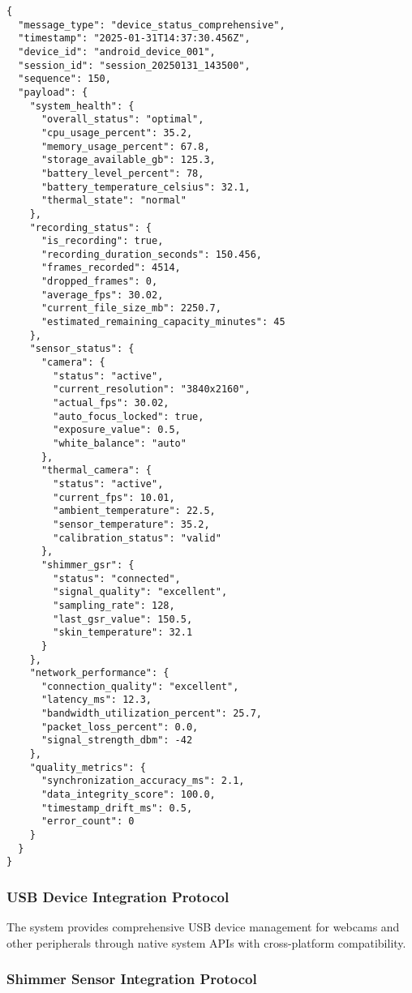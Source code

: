 \documentclass[12pt,a4paper]{article}
\begin{document}
\begin{verbatim}
{
  "message_type": "device_status_comprehensive",
  "timestamp": "2025-01-31T14:37:30.456Z",
  "device_id": "android_device_001",
  "session_id": "session_20250131_143500",
  "sequence": 150,
  "payload": {
    "system_health": {
      "overall_status": "optimal",
      "cpu_usage_percent": 35.2,
      "memory_usage_percent": 67.8,
      "storage_available_gb": 125.3,
      "battery_level_percent": 78,
      "battery_temperature_celsius": 32.1,
      "thermal_state": "normal"
    },
    "recording_status": {
      "is_recording": true,
      "recording_duration_seconds": 150.456,
      "frames_recorded": 4514,
      "dropped_frames": 0,
      "average_fps": 30.02,
      "current_file_size_mb": 2250.7,
      "estimated_remaining_capacity_minutes": 45
    },
    "sensor_status": {
      "camera": {
        "status": "active",
        "current_resolution": "3840x2160",
        "actual_fps": 30.02,
        "auto_focus_locked": true,
        "exposure_value": 0.5,
        "white_balance": "auto"
      },
      "thermal_camera": {
        "status": "active",
        "current_fps": 10.01,
        "ambient_temperature": 22.5,
        "sensor_temperature": 35.2,
        "calibration_status": "valid"
      },
      "shimmer_gsr": {
        "status": "connected",
        "signal_quality": "excellent",
        "sampling_rate": 128,
        "last_gsr_value": 150.5,
        "skin_temperature": 32.1
      }
    },
    "network_performance": {
      "connection_quality": "excellent",
      "latency_ms": 12.3,
      "bandwidth_utilization_percent": 25.7,
      "packet_loss_percent": 0.0,
      "signal_strength_dbm": -42
    },
    "quality_metrics": {
      "synchronization_accuracy_ms": 2.1,
      "data_integrity_score": 100.0,
      "timestamp_drift_ms": 0.5,
      "error_count": 0
    }
  }
}
\end{verbatim}

\subsubsection{USB Device Integration Protocol}

The system provides comprehensive USB device management for webcams and other peripherals through native system APIs
with cross-platform compatibility.

\subsubsection{Shimmer Sensor Integration Protocol}
\end{document}
